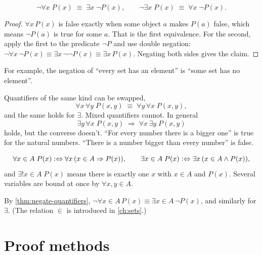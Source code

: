 \begin{theorem}
\label{thm:negate-quantifiers}
\[
  \lnot \forall x\; P(x) \;\equiv\; \exists x\; \lnot P(x), \qquad
  \lnot \exists x\; P(x) \;\equiv\; \forall x\; \lnot P(x).
\]
\end{theorem}

\begin{proof}
$\forall x\, P(x)$ is false exactly when some object $a$ makes $P(a)$ false, which
means $\lnot P(a)$ is true for some $a$. That is the first equivalence. For the
second, apply the first to the predicate $\lnot P$ and use double negation:
$\lnot \forall x\, \lnot P(x) \equiv \exists x\, \lnot\lnot P(x) \equiv \exists
x\, P(x)$. Negating both sides gives the claim.
\end{proof}

For example, the negation of \enquote{every set has an element} is \enquote{some
set has no element}.

\begin{remark}
\label{rem:quantifier-order}
Quantifiers of the same kind can be swapped,
\[
  \forall x\, \forall y\; P(x,y) \;\equiv\; \forall y\, \forall x\; P(x,y),
\]
and the same holds for $\exists$. Mixed quantifiers cannot. In general
\[
  \exists y\, \forall x\; P(x,y) \;\Rightarrow\; \forall x\, \exists y\; P(x,y)
\]
holds, but the converse doesn't. \enquote{For every number there is a bigger one}
is true for the natural numbers. \enquote{There is a number bigger than every
number} is false.
\end{remark}

\begin{definition}
\label{def:bounded}
\[
  \forall x \in A\; P(x) \mathrel{\vcentcolon\Leftrightarrow} \forall x\, (x \in A \Rightarrow P(x)), \qquad
  \exists x \in A\; P(x) \mathrel{\vcentcolon\Leftrightarrow} \exists x\, (x \in A \land P(x)),
\]
and $\exists! x \in A\; P(x)$ means there is exactly one $x$ with $x \in A$ and
$P(x)$. Several variables are bound at once by $\forall x, y \in A$.
\end{definition}

By \cref{thm:negate-quantifiers}, $\lnot \forall x \in A\, P(x) \equiv \exists x
\in A\, \lnot P(x)$, and similarly for $\exists$. (The relation $\in$ is introduced
in \cref{ch:sets}.)

\section{Proof methods}
\label{sec:proof-methods}


